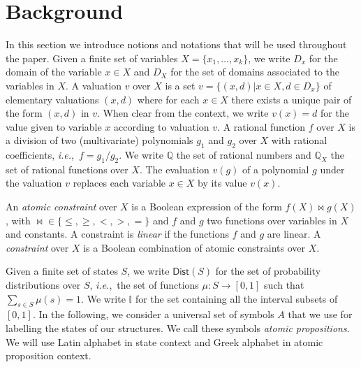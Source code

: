 \documentclass{llncs}
\newcommand{\Dist}{\ensuremath{\mathsf{Dist}}}
\newcommand{\ie} {{\em i.e.},\ }
\newcommand{\Inter}  {\ensuremath{{\mathbb{I}}}}
\newcommand{\Qset}             {\ensuremath{\mathbb{Q}}}
\newcommand{\comment}[2]{{\color{gray}{\small{\underline{#1:} #2}}}}
\newcommand{\didier}[1]{\marginpar{\comment{Didier}{#1}}}%
\begin{document}
\section{Background}\label{sec:background}

In this section we introduce notions and notations that will be used
throughout the paper. Given a finite set of variables $X = \{x_1, \ldots, x_k\}$, we write
$D_x$ for the domain of the variable $x \in X$ and $D_X$ for the set
of domains associated to the variables in $X$. A valuation
$v$ over $X$ is a set $v = \{(x,d) | x \in X, d \in D_x\}$ of
elementary valuations $(x,d)$ where for each $x \in X$ there exists a
unique pair of the form $(x, d)$ in $v$. When clear from the context,
we write $v(x) = d$ for the value given to variable $x$ according to
valuation $v$. A rational function $f$ over $X$ is a division of two
(multivariate) polynomials $g_1$ and $g_2$ over $X$ with rational
coefficients, \ie $f = g_1 / g_2$. We write ${\Qset}$ the set of 
 rational numbers and ${\Qset}_X$ the set of 
rational functions over $X$.  The evaluation $v(g)$ of a polynomial
$g$ under the valuation $v$ replaces each variable $x \in X$ by its value $v(x)$.

An {\em atomic constraint} over $X$ is a Boolean expression of the
form $f(X) \bowtie g(X)$, with ${\bowtie} \in \{\le, \ge, <, >, =\}$ and
$f$ and $g$ two functions over variables in $X$ and constants. A
constraint is {\em linear} if the functions $f$ and $g$ are
linear. 
A {\em constraint} over $X$ is a
Boolean combination of atomic constraints over $X$.


Given a finite set of states $S$, we write $\Dist(S)$ for the set of
probability distributions over $S$, \ie the set of functions $\mu : S
\to [0,1]$ such that $\sum_{s\in S}\mu(s) = 1$. We write $\Inter$
for the set containing all the interval subsets of $[0,1]$.  In the
following, we consider a universal set of symbols $A$ that we use for
labelling the states of our structures. We call these symbols {\em
  atomic propositions}.  We will use Latin alphabet in state context
and Greek alphabet in atomic proposition context.
\end{document}
